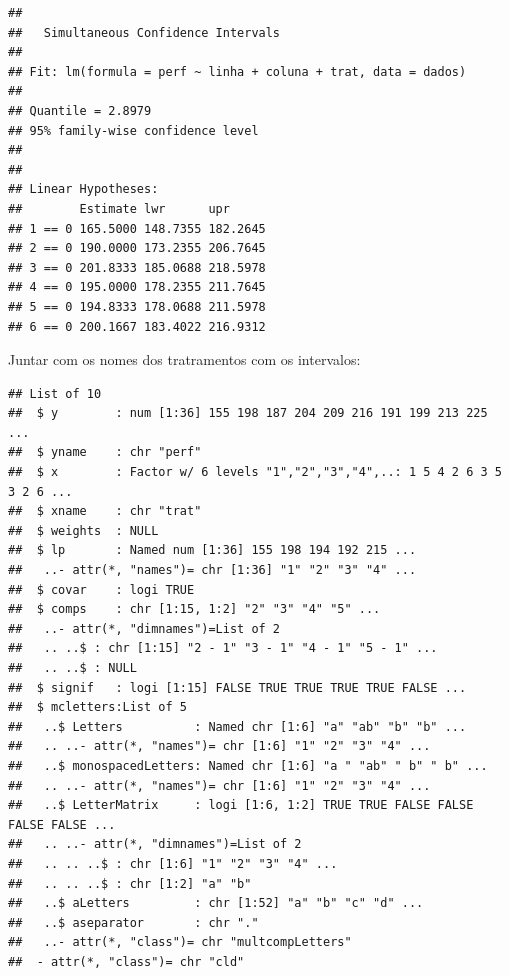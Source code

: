 \documentclass[
]{book}
\newenvironment{Shaded}{\begin{snugshade}}{\end{snugshade}}
\newcommand{\KeywordTok}[1]{\textcolor[rgb]{0.13,0.29,0.53}{\textbf{#1}}}
\newcommand{\NormalTok}[1]{#1}
\newcommand{\OperatorTok}[1]{\textcolor[rgb]{0.81,0.36,0.00}{\textbf{#1}}}
\newcommand{\StringTok}[1]{\textcolor[rgb]{0.31,0.60,0.02}{#1}}
\begin{document}
\begin{verbatim}
## 
##   Simultaneous Confidence Intervals
## 
## Fit: lm(formula = perf ~ linha + coluna + trat, data = dados)
## 
## Quantile = 2.8979
## 95% family-wise confidence level
##  
## 
## Linear Hypotheses:
##        Estimate lwr      upr     
## 1 == 0 165.5000 148.7355 182.2645
## 2 == 0 190.0000 173.2355 206.7645
## 3 == 0 201.8333 185.0688 218.5978
## 4 == 0 195.0000 178.2355 211.7645
## 5 == 0 194.8333 178.0688 211.5978
## 6 == 0 200.1667 183.4022 216.9312
\end{verbatim}

Juntar com os nomes dos tratramentos com os intervalos:

\begin{Shaded}
\end{Shaded}

\begin{verbatim}
## List of 10
##  $ y        : num [1:36] 155 198 187 204 209 216 191 199 213 225 ...
##  $ yname    : chr "perf"
##  $ x        : Factor w/ 6 levels "1","2","3","4",..: 1 5 4 2 6 3 5 3 2 6 ...
##  $ xname    : chr "trat"
##  $ weights  : NULL
##  $ lp       : Named num [1:36] 155 198 194 192 215 ...
##   ..- attr(*, "names")= chr [1:36] "1" "2" "3" "4" ...
##  $ covar    : logi TRUE
##  $ comps    : chr [1:15, 1:2] "2" "3" "4" "5" ...
##   ..- attr(*, "dimnames")=List of 2
##   .. ..$ : chr [1:15] "2 - 1" "3 - 1" "4 - 1" "5 - 1" ...
##   .. ..$ : NULL
##  $ signif   : logi [1:15] FALSE TRUE TRUE TRUE TRUE FALSE ...
##  $ mcletters:List of 5
##   ..$ Letters          : Named chr [1:6] "a" "ab" "b" "b" ...
##   .. ..- attr(*, "names")= chr [1:6] "1" "2" "3" "4" ...
##   ..$ monospacedLetters: Named chr [1:6] "a " "ab" " b" " b" ...
##   .. ..- attr(*, "names")= chr [1:6] "1" "2" "3" "4" ...
##   ..$ LetterMatrix     : logi [1:6, 1:2] TRUE TRUE FALSE FALSE FALSE FALSE ...
##   .. ..- attr(*, "dimnames")=List of 2
##   .. .. ..$ : chr [1:6] "1" "2" "3" "4" ...
##   .. .. ..$ : chr [1:2] "a" "b"
##   ..$ aLetters         : chr [1:52] "a" "b" "c" "d" ...
##   ..$ aseparator       : chr "."
##   ..- attr(*, "class")= chr "multcompLetters"
##  - attr(*, "class")= chr "cld"
\end{verbatim}
\end{document}
